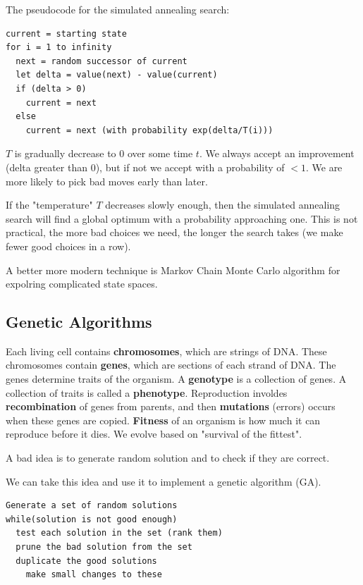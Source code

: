 \documentclass{article}
\begin{document}
The pseudocode for the simulated annealing search:

\begin{lstlisting}[inputencoding=utf8/latin1, keywordstyle=\color{blue}\bfseries, rulecolor=\color{black}]
current = starting state 
for i = 1 to infinity
  next = random successor of current 
  let delta = value(next) - value(current)
  if (delta > 0)
    current = next
  else 
    current = next (with probability exp(delta/T(i)))
\end{lstlisting}

$T$ is gradually decrease to $0$ over some time $t$. We always accept an
improvement (delta greater than 0), but if not we accept with a probability of
$< 1$. We are more likely to pick bad moves early than later.

If the "temperature" $T$ decreases slowly enough, then the simulated annealing
search will find a global optimum with a probability approaching one. This is
not practical, the more bad choices we need, the longer the search takes (we
make fewer good choices in a row).

A better more modern technique is Markov Chain Monte Carlo algorithm for
expolring complicated state spaces.

\subsection{Genetic Algorithms}%
\label{sub:genetic_algorithms}

Each living cell contains \textbf{chromosomes}, which are strings of DNA. These
chromosomes contain \textbf{genes}, which are sections of each strand of DNA.
The genes determine traits of the organism. A \textbf{genotype} is a collection
of genes. A collection of traits is called a \textbf{phenotype}. Reproduction
involdes \textbf{recombination} of genes from parents, and then
\textbf{mutations} (errors) occurs when these genes are copied. \textbf{Fitness}
of an organism is how much it can reproduce before it dies.
We evolve based on "survival of the fittest".\cite[p.  21]{presentation:local_search_algorithms}

A bad idea is to generate random solution and to check if they are correct.

We can take this idea and use it to implement a genetic algorithm (GA).

\begin{lstlisting}[inputencoding=utf8/latin1, keywordstyle=\color{blue}\bfseries, rulecolor=\color{black}]
Generate a set of random solutions
while(solution is not good enough)
  test each solution in the set (rank them)
  prune the bad solution from the set
  duplicate the good solutions
    make small changes to these
\end{lstlisting}
\end{document}
